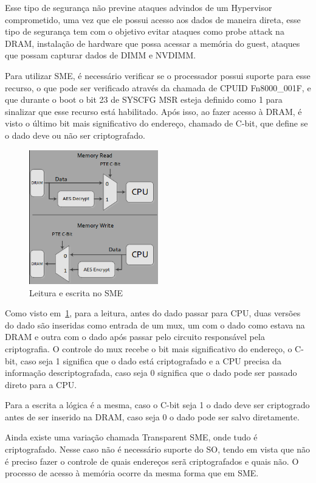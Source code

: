 \documentclass{report}
\begin{document}
Esse tipo de segurança não previne ataques advindos de um Hypervisor
comprometido, uma vez que ele possui acesso aos dados de maneira direta, esse
tipo de segurança tem com o objetivo evitar ataques como probe attack na
DRAM, instalação de hardware que possa acessar a memória do guest, ataques que
possam capturar dados de DIMM e NVDIMM\@.

Para utilizar SME, é necessário verificar se o processador possui suporte para
esse recurso, o que pode ser verificado através da chamada de CPUID
Fn8000\_001F, e que durante o boot o bit 23 de SYSCFG MSR esteja definido como
1 para sinalizar que esse recurso está habilitado. Após isso, ao fazer acesso à
DRAM, é visto o último bit mais significativo do endereço, chamado de C-bit,
que define se o dado deve ou não ser criptografado.

\begin{figure}[h]
    \centering
    \includegraphics[width=0.5\textwidth]{img/sme_read_write_architecture.png}
    \caption{Leitura e escrita no SME}\label{sme-read-write}
\end{figure}

Como visto em~\ref{sme-read-write}, para a leitura, antes do dado passar para
CPU, duas versões do dado são inseridas como entrada de um mux, um com o dado
como estava na DRAM e outra com o dado após passar pelo circuito responsável
pela criptografia. O controle do mux recebe o bit mais significativo do
endereço, o C-bit, caso seja 1 significa que o dado está criptografado e a CPU
precisa da informação descriptografada, caso seja 0 significa que o dado pode
ser passado direto para a CPU\@.

Para a escrita a lógica é a mesma, caso o C-bit seja 1 o dado deve ser
criptogrado antes de ser inserido na DRAM, caso seja 0 o dado pode ser salvo
diretamente.

Ainda existe uma variação chamada Transparent SME, onde tudo é criptografado.
Nesse caso não é necessário suporte do SO, tendo em vista que não é preciso
fazer o controle de quais endereços serã criptografados e quais não. O processo
de acesso à memória ocorre da mesma forma que em SME\@.
\end{document}
